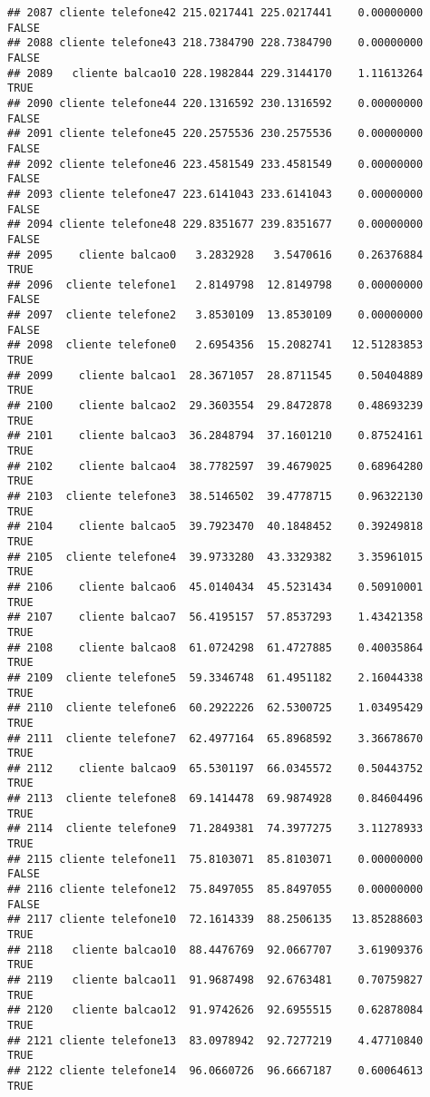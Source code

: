 \documentclass[
]{article}
\begin{document}
\begin{verbatim}
## 2087 cliente telefone42 215.0217441 225.0217441    0.00000000    FALSE
## 2088 cliente telefone43 218.7384790 228.7384790    0.00000000    FALSE
## 2089   cliente balcao10 228.1982844 229.3144170    1.11613264     TRUE
## 2090 cliente telefone44 220.1316592 230.1316592    0.00000000    FALSE
## 2091 cliente telefone45 220.2575536 230.2575536    0.00000000    FALSE
## 2092 cliente telefone46 223.4581549 233.4581549    0.00000000    FALSE
## 2093 cliente telefone47 223.6141043 233.6141043    0.00000000    FALSE
## 2094 cliente telefone48 229.8351677 239.8351677    0.00000000    FALSE
## 2095    cliente balcao0   3.2832928   3.5470616    0.26376884     TRUE
## 2096  cliente telefone1   2.8149798  12.8149798    0.00000000    FALSE
## 2097  cliente telefone2   3.8530109  13.8530109    0.00000000    FALSE
## 2098  cliente telefone0   2.6954356  15.2082741   12.51283853     TRUE
## 2099    cliente balcao1  28.3671057  28.8711545    0.50404889     TRUE
## 2100    cliente balcao2  29.3603554  29.8472878    0.48693239     TRUE
## 2101    cliente balcao3  36.2848794  37.1601210    0.87524161     TRUE
## 2102    cliente balcao4  38.7782597  39.4679025    0.68964280     TRUE
## 2103  cliente telefone3  38.5146502  39.4778715    0.96322130     TRUE
## 2104    cliente balcao5  39.7923470  40.1848452    0.39249818     TRUE
## 2105  cliente telefone4  39.9733280  43.3329382    3.35961015     TRUE
## 2106    cliente balcao6  45.0140434  45.5231434    0.50910001     TRUE
## 2107    cliente balcao7  56.4195157  57.8537293    1.43421358     TRUE
## 2108    cliente balcao8  61.0724298  61.4727885    0.40035864     TRUE
## 2109  cliente telefone5  59.3346748  61.4951182    2.16044338     TRUE
## 2110  cliente telefone6  60.2922226  62.5300725    1.03495429     TRUE
## 2111  cliente telefone7  62.4977164  65.8968592    3.36678670     TRUE
## 2112    cliente balcao9  65.5301197  66.0345572    0.50443752     TRUE
## 2113  cliente telefone8  69.1414478  69.9874928    0.84604496     TRUE
## 2114  cliente telefone9  71.2849381  74.3977275    3.11278933     TRUE
## 2115 cliente telefone11  75.8103071  85.8103071    0.00000000    FALSE
## 2116 cliente telefone12  75.8497055  85.8497055    0.00000000    FALSE
## 2117 cliente telefone10  72.1614339  88.2506135   13.85288603     TRUE
## 2118   cliente balcao10  88.4476769  92.0667707    3.61909376     TRUE
## 2119   cliente balcao11  91.9687498  92.6763481    0.70759827     TRUE
## 2120   cliente balcao12  91.9742626  92.6955515    0.62878084     TRUE
## 2121 cliente telefone13  83.0978942  92.7277219    4.47710840     TRUE
## 2122 cliente telefone14  96.0660726  96.6667187    0.60064613     TRUE

\end{verbatim}
\end{document}
